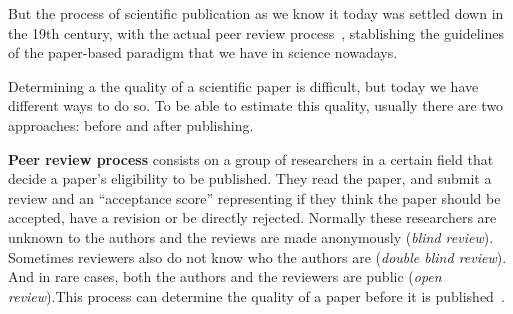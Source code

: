 
But the process of scientific publication as we know it today was settled down
in the 19th century, with the actual peer review
process~\cite{burnham1990evolution}, stablishing the guidelines of the
paper-based paradigm that we have in science nowadays.


Determining a the quality of a scientific paper is difficult, but today we have
different ways to do so. To be able to estimate this quality, usually there are
two approaches: before and after publishing.

\textbf{Peer review process} consists on a group of researchers in a certain
field that decide a paper's eligibility to be published. They read the paper,
and submit a review and an ``acceptance score'' representing if they think the
paper should be accepted, have a revision or be directly rejected. Normally
these researchers are unknown to the authors and the reviews are made
anonymously (\emph{blind review}). Sometimes reviewers also do not know who the
authors are (\emph{double blind review}). And in rare cases, both the authors
and the reviewers are public (\emph{open review}).This process can determine the
quality of a paper before it is published~\cite{szklo2006quality}.



